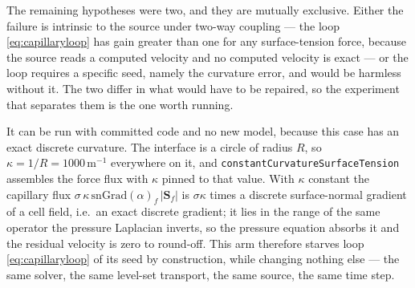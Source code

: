 \documentclass[preprint,3p,11pt]{elsarticle}
\begin{document}
The remaining hypotheses were two, and they are mutually exclusive. Either the
failure is intrinsic to the source under two-way coupling --- the loop
\eqref{eq:capillaryloop} has gain greater than one for any surface-tension force,
because the source reads a computed velocity and no computed velocity is exact
--- or the loop requires a specific seed, namely the curvature error, and would
be harmless without it. The two differ in what would have to be repaired, so the
experiment that separates them is the one worth running.

It can be run with committed code and no new model, because this case has an
exact discrete curvature. The interface is a circle of radius $R$, so
$\kappa = 1/R = 1000\,\mathrm{m^{-1}}$ everywhere on it, and
\texttt{constantCurvatureSurfaceTension} assembles the force flux with $\kappa$
pinned to that value. With $\kappa$ constant the capillary flux
$\sigma\,\kappa\,\mathrm{snGrad}(\alpha)_f\,|\mathbf{S}_f|$ is
$\sigma\kappa$ times a discrete surface-normal gradient of a cell field, i.e.\ an
exact discrete gradient; it lies in the range of the same operator the pressure
Laplacian inverts, so the pressure equation absorbs it and the residual velocity
is zero to round-off. This arm therefore starves loop
\eqref{eq:capillaryloop} of its seed by construction, while changing nothing else
--- the same solver, the same level-set transport, the same source, the same time
step.
\end{document}
